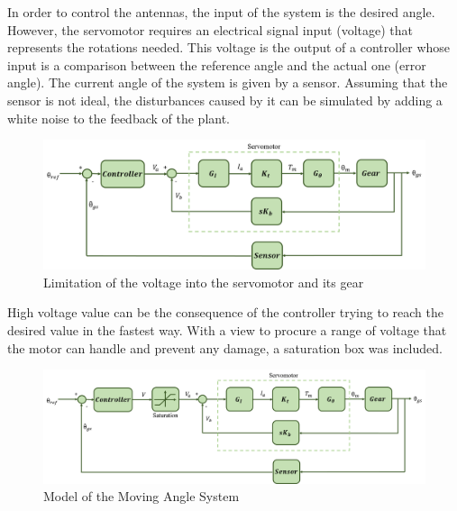 In order to control the antennas, the input of the system is the desired angle. However, the servomotor requires an electrical signal input (voltage) that represents the rotations needed. This voltage is the output of a controller whose input is a comparison between the reference angle and the actual one (error angle). The current angle of the system is given by a sensor.
Assuming that the sensor is not ideal, the disturbances caused by it can be simulated by adding a white noise to the feedback of the plant.

\begin{figure}[H]
\centering
\includegraphics[scale=0.5]{figures/servo+gear+noise.png}
\caption{Limitation of the voltage into the servomotor and its gear}
\label{model4}
\end{figure}

High voltage value can be the consequence of the controller trying to reach the desired value in the fastest way. With a view to procure a range of voltage that the motor can handle and prevent any damage, a saturation box was included.

\begin{figure}[H]
\centering
\includegraphics[scale=0.4]{figures/complete_model.png}
\caption{Model of the Moving Angle System}
\label{model4}
\end{figure}

